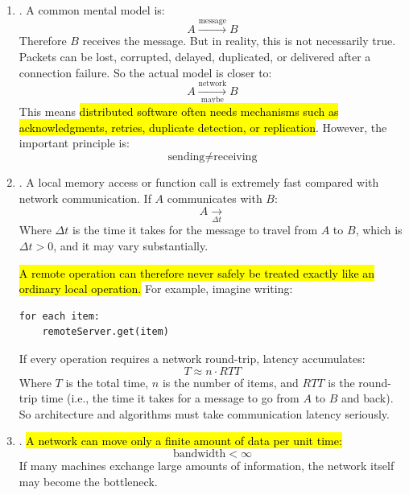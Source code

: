\begin{enumerate}
    \item {}. A common mental model is:
        \begin{equation*}
            A \xrightarrow{\text{message}} B
        \end{equation*}
        Therefore $B$ receives the message. But in reality, this is not necessarily true. Packets can be lost, corrupted, delayed, duplicated, or delivered after a connection failure. So the actual model is closer to:
        \begin{equation*}
            A \xrightarrow[\text{maybe}]{\text{network}} B
        \end{equation*}
        This means \hl{distributed software often needs mechanisms such as acknowledgments, retries, duplicate detection, or replication}. However, the important principle is:
        \begin{equation*}
            \text{sending} \neq \text{receiving}
        \end{equation*}

    \item {}. A local memory access or function call is extremely fast compared with network communication. If $A$ communicates with $B$:
        \begin{equation*}
            A \xrightarrow[\Delta t]{}
        \end{equation*}
        Where $\Delta t$ is the time it takes for the message to travel from $A$ to $B$, which is $\Delta t > 0$, and it may vary substantially.

        \hl{A remote operation can therefore never safely be treated exactly like an ordinary local operation.} For example, imagine writing:
    \begin{lstlisting}
for each item:
    remoteServer.get(item)
\end{lstlisting}
        If every operation requires a network round-trip, latency accumulates:
        \begin{equation*}
            T \approx n \cdot RTT
        \end{equation*}
        Where $T$ is the total time, $n$ is the number of items, and $RTT$ is the round-trip time (i.e., the time it takes for a message to go from $A$ to $B$ and back). So architecture and algorithms must take communication latency seriously.

    \item {}. \hl{A network can move only a finite amount of data per unit time:}
        \begin{equation*}
            \text{bandwidth} < \infty
        \end{equation*}
        If many machines exchange large amounts of information, the network itself may become the bottleneck.


\end{enumerate}
